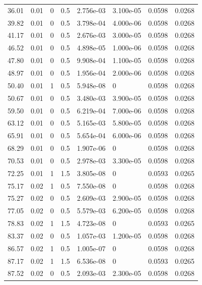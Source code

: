 \documentclass[preview]{standalone}
\begin{document}
{{\begin{tabular}{L{1.2cm}C{1.2cm} C{0.3cm}C{0.5cm} C{1.4cm}C{1.4cm} C{1.4cm}C{1.4cm}}
  36.01  &  0.01  & 0     & 0.5 &  2.756e-03  & 3.100e-05  & 0.0598 &  0.0268   \\ 
  39.82  &  0.01  & 0     & 0.5 &  3.798e-04  & 4.000e-06  & 0.0598 &  0.0268   \\ 
  41.17  &  0.01  & 0     & 0.5 &  2.676e-03  & 3.000e-05  & 0.0598 &  0.0268   \\ 
  46.52  &  0.01  & 0     & 0.5 &  4.898e-05  & 1.000e-06  & 0.0598 &  0.0268   \\ 
  47.80  &  0.01  & 0     & 0.5 &  9.908e-04  & 1.100e-05  & 0.0598 &  0.0268   \\ 
  48.97  &  0.01  & 0     & 0.5 &  1.956e-04  & 2.000e-06  & 0.0598 &  0.0268   \\ 
  50.40  &  0.01  & 1     & 0.5 &  5.948e-08  & 0  & 0.0598 &  0.0268   \\ 
  50.67  &  0.01  & 0     & 0.5 &  3.480e-03  & 3.900e-05  & 0.0598 &  0.0268   \\ 
  59.50  &  0.01  & 0     & 0.5 &  6.219e-04  & 7.000e-06  & 0.0598 &  0.0268   \\ 
  63.12  &  0.01  & 0     & 0.5 &  5.165e-03  & 5.800e-05  & 0.0598 &  0.0268   \\ 
  65.91  &  0.01  & 0     & 0.5 &  5.654e-04  & 6.000e-06  & 0.0598 &  0.0268   \\ 
  68.29  &  0.01  & 0     & 0.5 &  1.907e-06  & 0  & 0.0598 &  0.0268   \\ 
  70.53  &  0.01  & 0     & 0.5 &  2.978e-03  & 3.300e-05  & 0.0598 &  0.0268   \\ 
  72.25  &  0.01  & 1     & 1.5 &  3.805e-08  & 0  & 0.0593 &  0.0265   \\ 
  75.17  &  0.02  & 1     & 0.5 &  7.550e-08  & 0  & 0.0598 &  0.0268   \\ 
  75.27  &  0.02  & 0     & 0.5 &  2.609e-03  & 2.900e-05  & 0.0598 &  0.0268   \\ 
  77.05  &  0.02  & 0     & 0.5 &  5.579e-03  & 6.200e-05  & 0.0598 &  0.0268   \\ 
  78.83  &  0.02  & 1     & 1.5 &  4.723e-08  & 0  & 0.0593 &  0.0265   \\ 
  83.37  &  0.02  & 0     & 0.5 &  1.057e-03  & 1.200e-05  & 0.0598 &  0.0268   \\ 
  86.57  &  0.02  & 1     & 0.5 &  1.005e-07  & 0  & 0.0598 &  0.0268   \\ 
  87.17  &  0.02  & 1     & 1.5 &  6.536e-08  & 0  & 0.0593 &  0.0265   \\ 
  87.52  &  0.02  & 0     & 0.5 &  2.093e-03  & 2.300e-05  & 0.0598 &  0.0268   \\ 

\end{tabular}}}
\end{document}
